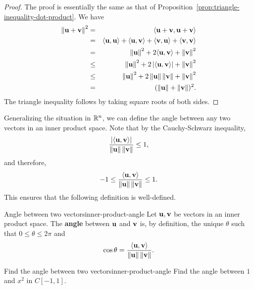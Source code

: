 \begin{proof}
  The proof is essentially the same as that of
  Proposition~\ref{prop:triangle-inequality-dot-product}. We have
  \begin{eqnarray*}
    \norm{\vect{u}+\vect{v}}^2
    &=& \iprod{\vect{u}+\vect{v},\vect{u}+\vect{v}} \\
    &=& \iprod{\vect{u},\vect{u}}+\iprod{\vect{u},\vect{v}}+\iprod{\vect{v},\vect{u}}+\iprod{\vect{v},\vect{v}} \\
    &=&\norm{\vect{u}}^2+2\iprod{\vect{u},\vect{v}}+\norm{\vect{v}}^2 \\
    &\leq& \norm{\vect{u}}^2+2\abs{\iprod{\vect{u},\vect{v}}}+\norm{\vect{v}}^2 \\
    &\leq& \norm{\vect{u}}^2+2\norm{\vect{u}}\norm{\vect{v}}+\norm{\vect{v}}^2 \\
    &=& (\norm{\vect{u}}+\norm{\vect{v}})^2.
  \end{eqnarray*}
  The triangle inequality follows by taking square roots of both sides.
\end{proof}

Generalizing the situation in $\mathbb{R}^n$, we can define the angle
between any two vectors in an inner product space. Note that by the
Cauchy-Schwarz inequality,
\begin{equation*}
  \frac{\abs{\iprod{\vect{u},\vect{v}}}}{\norm{\vect{u}}\norm{\vect{v}}}
  \leq 1,
\end{equation*}
and therefore,
\begin{equation*}
  -1 \leq \frac{\iprod{\vect{u},\vect{v}}}{\norm{\vect{u}}\norm{\vect{v}}}
  \leq 1.
\end{equation*}
This ensures that the following definition is well-defined.

\begin{definition}{Angle between two vectors}{inner-product-angle}
  Let $\vect{u},\vect{v}$ be vectors in an inner product space.
  The \textbf{angle}%
   between $\vect{u}$ and
  $\vect{v}$ is, by definition, the unique $\theta$ such that
  $0\leq\theta\leq 2\pi$ and
  \begin{equation*}
    \cos\theta = \frac{\iprod{\vect{u},\vect{v}}}{\norm{\vect{u}}\norm{\vect{v}}}.
  \end{equation*}
\end{definition}

\begin{example}{Find the angle between two vectors}{inner-product-angle}
  Find the angle between $1$ and $x^2$ in $C[-1,1]$.
\end{example}

